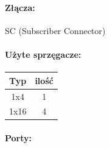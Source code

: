 	\paragraph{Złącza:}
		SC (Subscriber Connector)
	\paragraph{Użyte sprzęgacze:}
		\begin{center}
			\begin{table}[htbp]
				\begin{tabular}{|c|c|}
					\hline
					\textbf{Typ} & \textbf{ilość} \\ \hline
					1x4          & 1              \\ \hline
					1x16         & 4              \\ \hline
				\end{tabular}
			\end{table}
		\end{center}
	\paragraph{Porty:}
